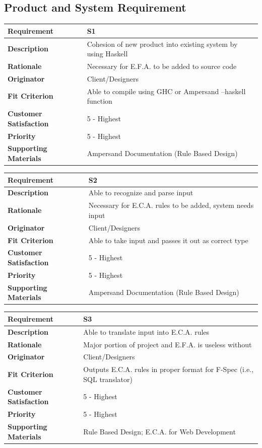 \documentclass[12pt]{report}
\begin{document}
\subsection{Product and System Requirement}

{\setlength{\tabcolsep}{12pt} %
\begin{tabularx}{\textwidth}{>{\bfseries}m{3cm}X}
Requirement & S1 \\ 
\midrule
\endhead
Description  & Cohesion of new product into existing system by using Haskell  
\\	Rationale & Necessary for E.F.A. to be added to source code 
\\	Originator & Client/Designers 
\\	Fit Criterion & Able to compile using GHC or Ampersand --haskell function  
\\	Customer Satisfaction & 5 - Highest
\\	Priority & 5 - Highest
\\	Supporting Materials & Ampersand Documentation (Rule Based Design) 
\vspace{12pt}
\end{tabularx}
}


{\setlength{\tabcolsep}{12pt} %
\begin{tabularx}{\textwidth}{>{\bfseries}m{3cm}X}
Requirement & S2 \\ 
\midrule
\endhead
	Description  & Able to recognize and parse input 
	\\	Rationale & Necessary for E.C.A. rules to be added, system needs input 
	\\	Originator & Client/Designers 
	\\	Fit Criterion & Able to take input and passes it out as correct type 
	\\	Customer Satisfaction & 5 - Highest
	\\	Priority & 5 - Highest
	\\	Supporting Materials & Ampersand Documentation (Rule Based Design) 
\vspace{12pt}
\end{tabularx}
}



{\setlength{\tabcolsep}{12pt} %
\begin{tabularx}{\textwidth}{>{\bfseries}m{3cm}X}
Requirement & S3 \\ 
\midrule
\endhead
	Description  & Able to translate input into E.C.A. rules 
	\\	Rationale & Major portion of project and E.F.A. is useless without 
	\\	Originator & Client/Designers 
	\\	Fit Criterion & Outputs E.C.A. rules in proper format for F-Spec (i.e., SQL 
	translator) 
	\\	Customer Satisfaction & 5 - Highest 
	\\	Priority & 5 - Highest 
	\\	Supporting Materials & Rule Based Design; E.C.A. for Web Development %
\vspace{12pt}
\end{tabularx}
}
\end{document}
